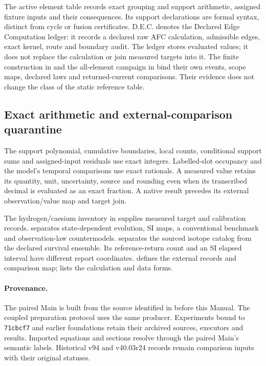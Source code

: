 The active element table records exact grouping and support arithmetic, assigned
fixture inputs and their consequences. Its support declarations are formal
syntax, distinct from cycle or fusion certificates. D.E.C. denotes the Declared
Edge Computation ledger: it records a declared raw AFC calculation, admissible
edges, exact kernel, route and boundary audit. The ledger stores evaluated
values; it does not replace the calculation or join measured targets into it.
The finite construction in  and the all-element
campaign in  bind their own events,
scope maps, declared laws and returned-current comparisons. Their evidence
does not change the class of the static reference table.

\subsection{Exact arithmetic and external-comparison quarantine}\label{manual2:exact-arithmetic-quarantine}
The support polynomial, cumulative boundaries, local counts, conditional support
sums and assigned-input residuals use exact integers. Labelled-slot occupancy
and the model's temporal comparisons use exact rationals. A measured value
retains its quantity, unit, uncertainty, source and rounding even when its
transcribed decimal is evaluated as an exact fraction. A native result precedes
its external observation/value map and target join.

The hydrogen/caesium inventory in 
supplies measured target and calibration records. 
separates state-dependent evolution, SI maps, a conventional benchmark and
observation-law countermodels.  separates the
sourced isotope catalog from the declared survival ensemble. Its
reference-return count and an SI elapsed interval have different report
coordinates.  defines the external
records and comparison map;  lists the
calculation and data forms.

\paragraph{Provenance.}
The paired Main is built from the source identified in
 before this Manual.
The coupled preparation protocol uses the same producer.
Experiments bound to \texttt{71cbcf7} and earlier foundations retain their
archived sources, executors and results. Imported equations and sections
resolve through the paired Main's semantic labels. Historical v94 and
v40.03r24 records remain comparison inputs with their original statuses.

